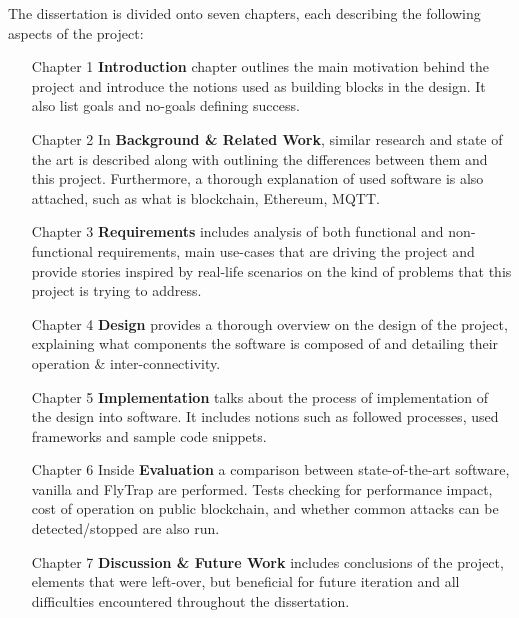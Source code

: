 The dissertation is divided onto seven chapters, each describing the following aspects of the project:
\begin{itemize}[leftmargin=4.5em]
  \item[Chapter 1] \textbf{Introduction} chapter outlines the main motivation behind the project and introduce the notions used as building blocks in the design. It also list goals and no-goals defining success.
  \item[Chapter 2] In \textbf{Background \& Related Work}, similar research and state of the art is described along with outlining the differences between them and this project. Furthermore, a thorough explanation of used software is also  attached, such as what is blockchain, Ethereum, MQTT. 
  \item[Chapter 3] \textbf{Requirements} includes analysis of both functional and non-functional requirements, main use-cases that are driving the project and provide stories inspired by real-life scenarios on the kind of problems that this project is trying to address.
  \item[Chapter 4] \textbf{Design} provides a thorough overview on the design of the project, explaining what components the software is composed of and detailing their operation \& inter-connectivity.
  \item[Chapter 5] \textbf{Implementation} talks about the process of implementation of the design into software. It includes notions such as followed processes, used frameworks and sample code snippets.
  \item[Chapter 6] Inside \textbf{Evaluation} a comparison between state-of-the-art software, vanilla and FlyTrap are performed. Tests checking for performance impact, cost of operation on public blockchain, and whether common attacks can be detected/stopped are also run.
  \item[Chapter 7] \textbf{Discussion \& Future Work} includes conclusions of the project, elements that were left-over, but beneficial for future iteration and all difficulties encountered throughout the dissertation. 
\end{itemize}
